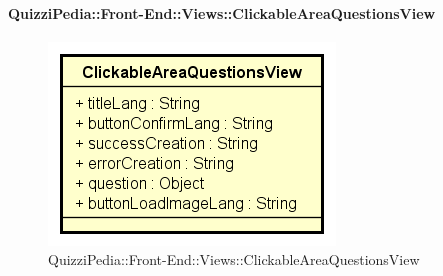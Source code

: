 \paragraph{QuizziPedia::Front-End::Views::ClickableAreaQuestionsView}
\begin{figure} [ht]
	\centering
	\includegraphics[scale=0.80]{UML/Classi/Front-End/QuizziPedia_Front-end_ClickableAreaQuestionsView.png}
	\caption{QuizziPedia::Front-End::Views::ClickableAreaQuestionsView}
\end{figure} \FloatBarrier
